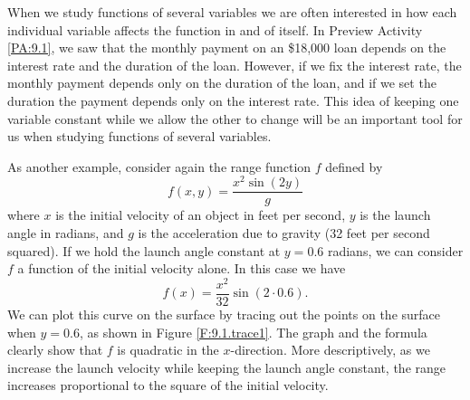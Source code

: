When we study functions of several variables we are often interested
in how each individual variable affects the function in and of
itself. In Preview Activity \ref{PA:9.1}, we saw that the monthly
payment on an \$18,000 loan depends on the interest rate and the
duration of the loan. However, if we fix the interest rate, the
monthly payment depends only on the duration of the loan, and if we
set the duration the payment depends only on the interest rate. This
idea of keeping one variable constant while we allow the other to
change will be an important tool for us when studying functions of
several variables.

As another example, consider again the range function $f$ defined by
\[f(x,y) = \frac{x^2 \sin(2y)}{g}\] where $x$ is the initial velocity
of an object in feet per second, $y$ is the launch angle in radians,
and $g$ is the acceleration due to gravity (32 feet per second
squared). If we hold the launch angle constant at $y=0.6$ radians, we
can consider $f$ a function of the initial velocity alone. In this
case we have
\[f(x) = \frac{x^2}{32}\sin(2\cdot 0.6).\]
We can plot this curve on the surface by tracing out the points on the
surface when $y = 0.6$, as shown in Figure
\ref{F:9.1.trace1}. The graph and the formula clearly show that $f$ is
quadratic in the $x$-direction. More descriptively, as we increase the
launch velocity while keeping the launch angle constant, the range
increases proportional to the square of the initial velocity.

